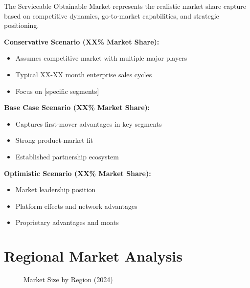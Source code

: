 \documentclass[11pt,letterpaper]{report}
\begin{document}
The Serviceable Obtainable Market represents the realistic market share capture based on competitive dynamics, go-to-market capabilities, and strategic positioning.

\begin{keyinsightbox}
\textbf{Conservative Scenario (XX\% Market Share):} 
\begin{itemize}
    \item Assumes competitive market with multiple major players
    \item Typical XX-XX month enterprise sales cycles
    \item Focus on [specific segments]
\end{itemize}

\textbf{Base Case Scenario (XX\% Market Share):} 
\begin{itemize}
    \item Captures first-mover advantages in key segments
    \item Strong product-market fit
    \item Established partnership ecosystem
\end{itemize}

\textbf{Optimistic Scenario (XX\% Market Share):} 
\begin{itemize}
    \item Market leadership position
    \item Platform effects and network advantages
    \item Proprietary advantages and moats
\end{itemize}
\end{keyinsightbox}

\section{Regional Market Analysis}


\begin{figure}[htbp]
\centering
\caption{Market Size by Region (2024)}
\label{fig:regional_breakdown}
\end{figure}
\end{document}
